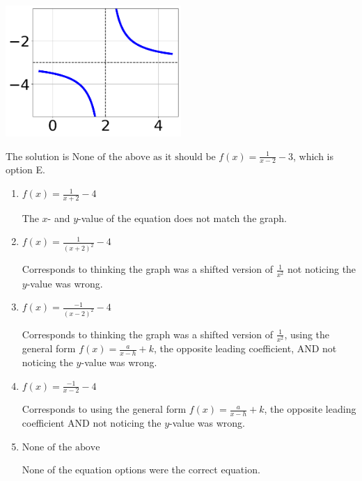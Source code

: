 \documentclass{extbook}[14pt]
\begin{document}
\begin{enumerate}
{\begin{center}
    \includegraphics[width=0.5\textwidth]{../Figures/rationalGraphToEquationCopyB.png}
\end{center}



The solution is \( \text{None of the above as it should be } f(x) = \frac{1}{x - 2} - 3 \), which is option E.\begin{enumerate}[label=\Alph*.]
\item \( f(x) = \frac{1}{x + 2} - 4 \)

The $x$- and $y$-value of the equation does not match the graph.
\item \( f(x) = \frac{1}{(x + 2)^2} - 4 \)

Corresponds to thinking the graph was a shifted version of $\frac{1}{x^2}$ not noticing the $y$-value was wrong.
\item \( f(x) = \frac{-1}{(x - 2)^2} - 4 \)

Corresponds to thinking the graph was a shifted version of $\frac{1}{x^2}$, using the general form $f(x) = \frac{a}{x-h}+k$, the opposite leading coefficient, AND not noticing the $y$-value was wrong.
\item \( f(x) = \frac{-1}{x - 2} - 4 \)

Corresponds to using the general form $f(x) = \frac{a}{x-h}+k$, the opposite leading coefficient AND not noticing the $y$-value was wrong.
\item \( \text{None of the above} \)

None of the equation options were the correct equation.
\end{enumerate}

}
\end{enumerate}
\end{document}
